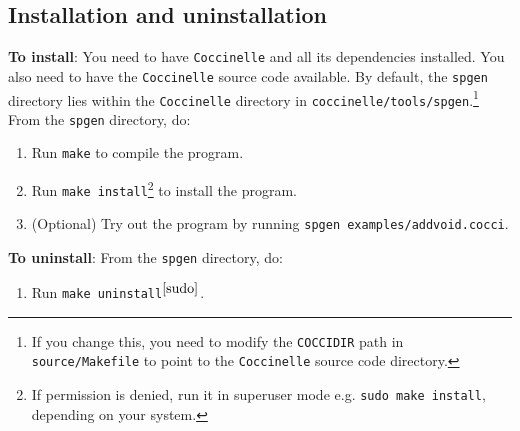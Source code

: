 \subsection{Installation and uninstallation}
\textbf{To install}: You need to have \texttt{Coccinelle} and all its dependencies installed. You also need to have the \texttt{Coccinelle} source code available. By default, the \texttt{spgen} directory lies within the \texttt{Coccinelle} directory in \texttt{coccinelle/tools/spgen}.\footnote{If you change this, you need to modify the \texttt{COCCIDIR} path in \texttt{source/Makefile} to point to the \texttt{Coccinelle} source code directory.} From the \texttt{spgen} directory, do:
\begin{enumerate}
\item Run \texttt{make} to compile the program.
\item Run \texttt{make install}\footnote{If permission is denied, run it in superuser mode e.g. \texttt{sudo make install}, depending on your system.\label{sudo}} to install the program.
\item (Optional) Try out the program by running \texttt{spgen examples/addvoid.cocci}.
\end{enumerate}
\textbf{To uninstall}: From the \texttt{spgen} directory, do:
\begin{enumerate}
\item Run \texttt{make uninstall}$^{\ref{sudo}}$.
\end{enumerate}
\bigskip

